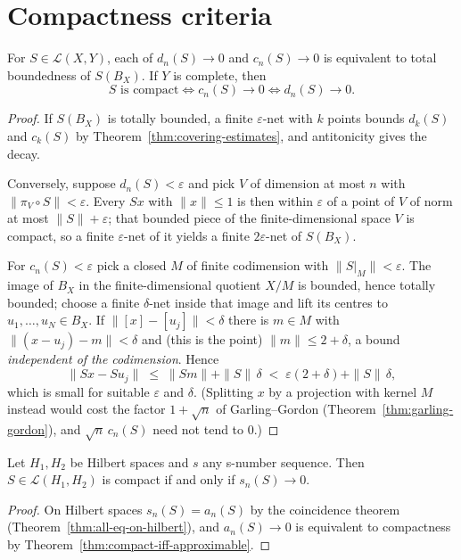 \section{Compactness criteria}
\label{sec:compactness-criteria}

\begin{theorem}
\label{thm:compact-iff-gelfand-kolmogorov}
\leanok
{}
For $S \in \mathcal{L}(X, Y)$, each of $d_n(S) \to 0$ and $c_n(S) \to 0$ is
equivalent to total boundedness of $S(B_X)$. If $Y$ is complete, then
\[
  S \text{ is compact} \iff c_n(S) \to 0 \iff d_n(S) \to 0 .
\]
\end{theorem}
\begin{proof}
\leanok
If $S(B_X)$ is totally bounded, a finite $\varepsilon$-net with $k$ points
bounds $d_k(S)$ and $c_k(S)$ by Theorem~\ref{thm:covering-estimates}, and
antitonicity gives the decay.

Conversely, suppose $d_n(S) < \varepsilon$ and pick $V$ of dimension at most
$n$ with $\|\pi_V \circ S\| < \varepsilon$. Every $Sx$ with $\|x\| \le 1$ is
then within $\varepsilon$ of a point of $V$ of norm at most
$\|S\| + \varepsilon$; that bounded piece of the finite-dimensional space $V$
is compact, so a finite $\varepsilon$-net of it yields a finite
$2\varepsilon$-net of $S(B_X)$.

For $c_n(S) < \varepsilon$ pick a closed $M$ of finite codimension with
$\|S|_M\| < \varepsilon$. The image of $B_X$ in the finite-dimensional
quotient $X / M$ is bounded, hence totally bounded; choose a finite
$\delta$-net inside that image and lift its centres to $u_1, \dots, u_N \in
B_X$. If $\|[x] - [u_j]\| < \delta$ there is $m \in M$ with
$\|(x - u_j) - m\| < \delta$ and (this is the point)
$\|m\| \le 2 + \delta$, a bound \emph{independent of the codimension}. Hence
\[
  \|Sx - Su_j\| \;\le\; \|Sm\| + \|S\|\,\delta
  \;<\; \varepsilon (2 + \delta) + \|S\|\,\delta ,
\]
which is small for suitable $\varepsilon$ and $\delta$. (Splitting $x$ by a
projection with kernel $M$ instead would cost the factor $1 + \sqrt{n}$ of
Garling--Gordon (Theorem~\ref{thm:garling-gordon}), and $\sqrt{n}\, c_n(S)$
need not tend to $0$.)
\end{proof}

\begin{theorem}
\label{thm:compact-iff-sn-hilbert}
\leanok
Let $H_1, H_2$ be Hilbert spaces and $s$ any s-number sequence. Then
$S \in \mathcal{L}(H_1, H_2)$ is compact if and only if $s_n(S) \to 0$.
\end{theorem}
\begin{proof}
\leanok
{}
On Hilbert spaces $s_n(S) = a_n(S)$ by the coincidence theorem
(Theorem~\ref{thm:all-eq-on-hilbert}), and $a_n(S) \to 0$ is equivalent to
compactness by Theorem~\ref{thm:compact-iff-approximable}.
\end{proof}

